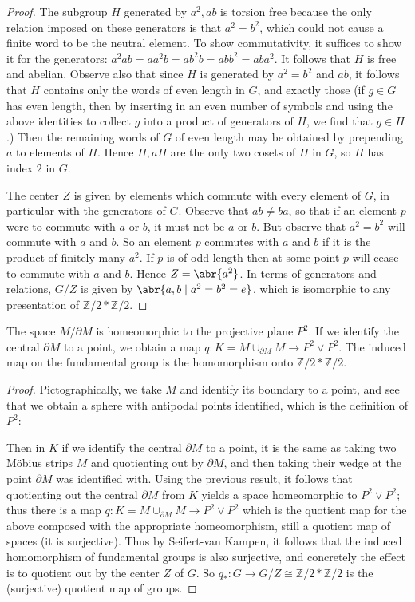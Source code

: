 \documentclass[11pt]{article}
\begin{document}
\begin{enumerate}
\begin{proof}
      The subgroup $H$ generated by $a^2,ab$ is torsion free because the only relation imposed on these generators is that $a^2 =b^2$, which could not cause a finite word to be the neutral element. To show commutativity, it suffices to show it for the generators: $a^2ab = aa^2b = ab^2b = abb^2 = aba^2$. It follows that $H$ is free and abelian. Observe also that since $H$ is generated by $a^2 = b^2$ and $ab$, it follows that $H$ contains only the words of even length in $G$, and exactly those (if $g\in G$ has even length, then by inserting in an even number of symbols and using the above identities to collect $g$ into a product of generators of $H$, we find that $g\in H$.) Then the remaining words of $G$ of even length may be obtained by prepending $a$ to elements of $H$. Hence $H,aH$ are the only two cosets of $H$ in $G$, so $H$ has index $2$ in $G$.

      The center $Z$ is given by elements which commute with every element of $G$, in particular with the generators of $G$. Observe that $ab\neq ba$, so that if an element $p$ were to commute with $a$ or $b$, it must not be $a$ or $b$. But observe that $a^2 = b^2$ will commute with $a$ and $b$. So an element $p$ commutes with $a$ and $b$ if it is the product of finitely many $a^2$. If $p$ is of odd length then at some point $p$ will cease to commute with $a$ and $b$. Hence $Z = \abr{a^2}$. In terms of generators and relations, $G/Z$ is given by $\abr{a,b\mid a^2 = b^2 = e}$, which is isomorphic to any presentation of $\mathbb{Z}/2\ast \mathbb{Z}/2$.
    \end{proof}

    The space $M/\partial M$ is homeomorphic to the projective plane $P^2$. If we identify the central $\partial M$ to a point, we obtain a map $q\colon K = M \cup_{\partial M} M \to P^2\vee P^2$. The induced map on the fundamental group is the homomorphism onto $\mathbb{Z}/2\ast \mathbb{Z}/2$. \begin{proof}
      Pictographically, we take $M$ and identify its boundary to a point, and see that we obtain a sphere with antipodal points identified, which is the definition of $P^2$: \vspace*{5cm}

      Then in $K$ if we identify the central $\partial M$ to a point, it is the same as taking two M\"obius strips $M$ and quotienting out by $\partial M$, and then taking their wedge at the point $\partial M$ was identified with. Using the previous result, it follows that quotienting out the central $\partial M$ from $K$ yields a space homeomorphic to $P^2\vee P^2$; thus there is a map $q\colon K = M \cup_{\partial M} M \to P^2\vee P^2$ which is the quotient map for the above composed with the appropriate homeomorphism, still a quotient map of spaces (it is surjective). Thus by Seifert-van Kampen, it follows that the induced homomorphism of fundamental groups is also surjective, and concretely the effect is to quotient out by the center $Z$ of $G$. So $q_\ast\colon G\to G/Z\cong \mathbb{Z}/2\ast \mathbb{Z}/2$ is the (surjective) quotient map of groups.
    \end{proof}
\end{enumerate}
\end{document}
